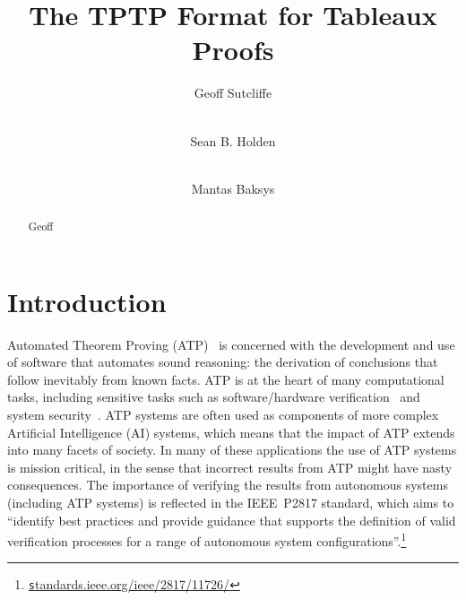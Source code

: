 \documentclass[runningheads]{llncs}
\newcommand{\smalltt}[1]{\small \texttt{#1}}
\begin{document}
\title{The TPTP Format for Tableaux Proofs}

\author{
Geoff Sutcliffe\Envelope
\and
\\ Sean B. Holden
\and
\\ Mantas Baksys
}

\maketitle
\begin{abstract}
Geoff

\end{abstract}
\section{Introduction}
\label{Introduction}


Automated Theorem Proving (ATP)~\cite{RV01-HAR} is concerned with the development and use of 
software that automates sound reasoning: the derivation of conclusions that follow inevitably 
from known facts.
ATP is at the heart of many computational tasks, including sensitive tasks such as 
software/hardware verification~\cite{HH19} and system security~\cite{Coo18}.
ATP systems are often used as components of more complex Artificial Intelligence (AI) systems,
which means that the impact of ATP extends into many facets of society.
In many of these applications the use of ATP systems is mission critical, in the sense that 
incorrect results from ATP might have nasty consequences.
The importance of verifying the results from autonomous systems (including ATP systems) is
reflected in the IEEE~P2817 standard, which aims to ``identify best practices and provide guidance 
that supports the definition of valid verification processes for a range of autonomous system 
configurations''.\footnote{%
\href{https://standards.ieee.org/ieee/2817/11726/}{\smalltt standards.ieee.org/ieee/2817/11726/}}
\end{document}
